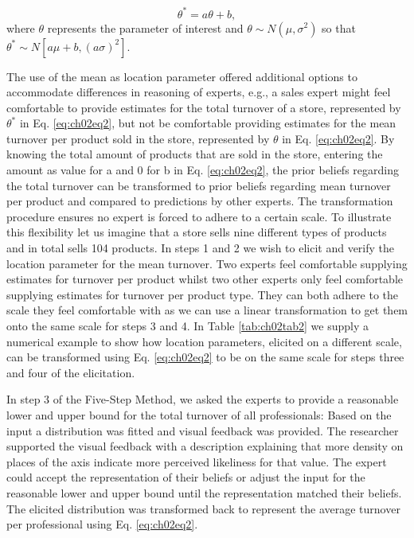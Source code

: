 \documentclass[openright,titlepage,12pt,a4paper]{book}
\begin{document}
\begin{equation} 
\theta^* = a\theta + b,
\label{eq:ch02eq2}
\end{equation}
where \(\theta\) represents the parameter of interest and \(\theta \sim N(\mu, \sigma^2)\) so that \(\theta^* \sim N[a\mu + b, (a\sigma)^2]\).

The use of the mean as location parameter offered additional options to accommodate differences in reasoning of experts, e.g., a sales expert might feel comfortable to provide estimates for the total turnover of a store, represented by \(\theta^*\) in Eq. \eqref{eq:ch02eq2}, but not be comfortable providing estimates for the mean turnover per product sold in the store, represented by \(\theta\) in Eq. \eqref{eq:ch02eq2}. By knowing the total amount of products that are sold in the store, entering the amount as value for a and 0 for b in Eq. \eqref{eq:ch02eq2}, the prior beliefs regarding the total turnover can be transformed to prior beliefs regarding mean turnover per product and compared to predictions by other experts. The transformation procedure ensures no expert is forced to adhere to a certain scale. To illustrate this flexibility let us imagine that a store sells nine different types of products and in total sells 104 products. In steps 1 and 2 we wish to elicit and verify the location parameter for the mean turnover. Two experts feel comfortable supplying estimates for turnover per product whilst two other experts only feel comfortable supplying estimates for turnover per product type. They can both adhere to the scale they feel comfortable with as we can use a linear transformation to get them onto the same scale for steps 3 and 4. In Table \ref{tab:ch02tab2} we supply a numerical example to show how location parameters, elicited on a different scale, can be transformed using Eq. \eqref{eq:ch02eq2} to be on the same scale for steps three and four of the elicitation.

In step 3 of the Five-Step Method, we asked the experts to provide a reasonable lower and upper bound for the total turnover of all professionals: Based on the input a distribution was fitted and visual feedback was provided. The researcher supported the visual feedback with a description explaining that more density on places of the axis indicate more perceived likeliness for that value. The expert could accept the representation of their beliefs or adjust the input for the reasonable lower and upper bound until the representation matched their beliefs. The elicited distribution was transformed back to represent the average turnover per professional using Eq. \eqref{eq:ch02eq2}.
\end{document}
